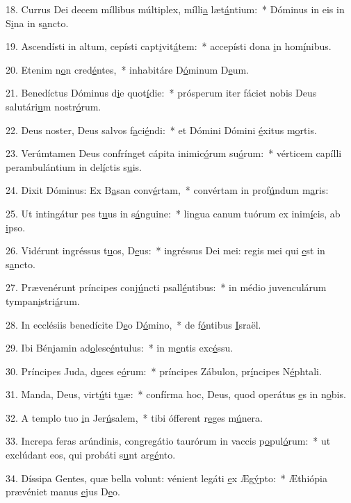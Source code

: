 18. Currus Dei decem míllibus múltiplex, mílli\uline{a} læt\uline{á}ntium:~* Dóminus in eis in S\uline{i}na in s\uline{a}ncto.\par 
19. Ascendísti in altum, cepísti capt\uline{i}vit\uline{á}tem:~* accepísti dona \uline{i}n hom\uline{í}nibus.\par 
20. Etenim n\uline{o}n cred\uline{é}ntes,~* inhabitáre D\uline{ó}minum D\uline{e}um.\par 
21. Benedíctus Dóminus d\uline{i}e quot\uline{í}die:~* prósperum iter fáciet nobis Deus salutári\uline{u}m nostr\uline{ó}rum.\par 
22. Deus noster, Deus salvos f\uline{a}ci\uline{é}ndi:~* et Dómini Dómini \uline{é}xitus m\uline{o}rtis.\par 
23. Verúmtamen Deus confrínget cápita inimic\uline{ó}rum su\uline{ó}rum:~* vérticem capílli perambulántium in del\uline{í}ctis s\uline{u}is.\par 
24. Dixit Dóminus: Ex B\uline{a}san conv\uline{é}rtam,~* convértam in prof\uline{ú}ndum m\uline{a}ris:\par 
25. Ut intingátur pes t\uline{u}us in s\uline{á}nguine:~* lingua canum tuórum ex inim\uline{í}cis, ab \uline{i}pso.\par 
26. Vidérunt ingréssus t\uline{u}os, D\uline{e}us:~* ingréssus Dei mei: regis mei qui \uline{e}st in s\uline{a}ncto.\par 
27. Prævenérunt príncipes conj\uline{ú}ncti psall\uline{é}ntibus:~* in médio juvenculárum tympan\uline{i}stri\uline{á}rum.\par 
28. In ecclésiis benedícite D\uline{e}o D\uline{ó}mino,~* de f\uline{ó}ntibus \uline{I}sraël.\par 
29. Ibi Bénjamin ad\uline{o}lesc\uline{é}ntulus:~* in m\uline{e}ntis exc\uline{é}ssu.\par 
30. Príncipes Juda, d\uline{u}ces e\uline{ó}rum:~* príncipes Zábulon, pr\uline{í}ncipes N\uline{é}phtali.\par 
31. Manda, Deus, virt\uline{ú}ti t\uline{u}æ:~* confírma hoc, Deus, quod operátus \uline{e}s in n\uline{o}bis.\par 
32. A templo tuo \uline{i}n Jer\uline{ú}salem,~* tibi ófferent r\uline{e}ges m\uline{ú}nera.\par 
33. Increpa feras arúndinis, congregátio taurórum in vaccis p\uline{o}pul\uline{ó}rum:~* ut exclúdant eos, qui probáti s\uline{u}nt arg\uline{é}nto.\par 
34. Díssipa Gentes, quæ bella volunt: vénient legáti \uline{e}x Æg\uline{ý}pto:~* Æthiópia prævéniet manus \uline{e}jus D\uline{e}o.\par 
